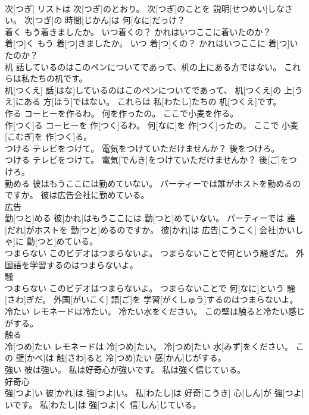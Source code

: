 \documentclass[8pt]{extreport}
\begin{document}
\begin{CJK}{UTF8}{min}
\\	次[つぎ] リストは 次[つぎ]のとおり。 次[つぎ]のことを 説明[せつめい]しなさい。 次[つぎ]の 時間[じかん]は 何[なに]だっけ？
\\	着く もう着きましたか。 いつ着くの？ かれはいつここに着いたのか？	
\\	着[つ]く もう 着[つ]きましたか。 いつ 着[つ]くの？ かれはいつここに 着[つ]いたのか？
\\	机 話しているのはこのペンについてであって、机の上にある方ではない。 これらは私たちの机です。	
\\	机[つくえ] 話[はな]しているのはこのペンについてであって、 机[つくえ]の 上[うえ]にある 方[ほう]ではない。 これらは 私[わたし]たちの 机[つくえ]です。
\\	作る コーヒーを作るわ。 何を作ったの。 ここで小麦を作る。	
\\	作[つく]る コーヒーを 作[つく]るわ。 何[なに]を 作[つく]ったの。 ここで 小麦[こむぎ]を 作[つく]る。
\\	つける テレビをつけて。 電気をつけていただけませんか？ 後をつけろ。	
\\	つける テレビをつけて。 電気[でんき]をつけていただけませんか？ 後[ご]をつけろ。
\\	勤める 彼はもうここには勤めていない。 パーティーでは誰がホストを勤めるのですか。 彼は広告会社に勤めている。	
\\	広告
\\	勤[つと]める 彼[かれ]はもうここには 勤[つと]めていない。 パーティーでは 誰[だれ]がホストを 勤[つと]めるのですか。 彼[かれ]は 広告[こうこく] 会社[かいしゃ]に 勤[つと]めている。
\\	つまらない このビデオはつまらないよ。 つまらないことで何という騒ぎだ。 外国語を学習するのはつまらないよ。	
\\	騒 
\\	つまらない このビデオはつまらないよ。 つまらないことで 何[なに]という 騒[さわ]ぎだ。 外国[がいこく] 語[ご]を 学習[がくしゅう]するのはつまらないよ。
\\	冷たい レモネードは冷たい。 冷たい水をください。 この壁は触ると冷たい感じがする。	
\\	触る 
\\	冷[つめ]たい レモネードは 冷[つめ]たい。 冷[つめ]たい 水[みず]をください。 この 壁[かべ]は 触[さわ]ると 冷[つめ]たい 感[かん]じがする。
\\	強い 彼は強い。 私は好奇心が強いです。 私は強く信じている。	
\\	好奇心 
\\	強[つよ]い 彼[かれ]は 強[つよ]い。 私[わたし]は 好奇[こうき] 心[しん]が 強[つよ]いです。 私[わたし]は 強[つよ]く 信[しん]じている。

\end{CJK}
\end{document}
